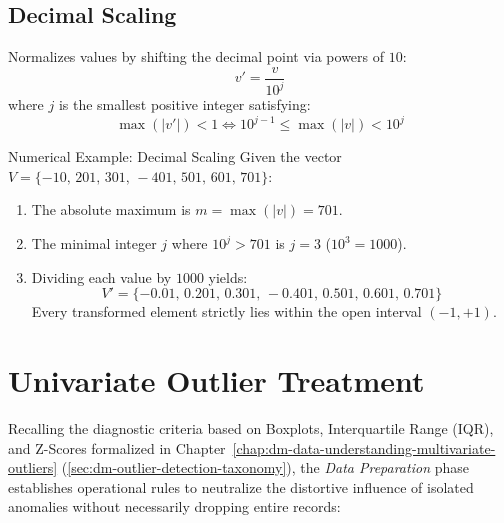 \subsection{Decimal Scaling}
Normalizes values by shifting the decimal point via powers of $10$:
\begin{equation}
    v' = \frac{v}{10^j}
\end{equation}
where $j$ is the smallest positive integer satisfying:
\begin{equation}
    \max(|v'|) < 1 \iff 10^{j-1} \le \max(|v|) < 10^j
\end{equation}

\begin{noteblock}{Numerical Example: Decimal Scaling}
Given the vector $V = \{-10,\, 201,\, 301,\, -401,\, 501,\, 601,\, 701\}$:
\begin{enumerate}
    \item The absolute maximum is $m = \max(|v|) = 701$.
    \item The minimal integer $j$ where $10^j > 701$ is $j=3$ ($10^3 = 1000$).
    \item Dividing each value by $1000$ yields:
    \begin{equation}
        V' = \{-0.01,\, 0.201,\, 0.301,\, -0.401,\, 0.501,\, 0.601,\, 0.701\}
    \end{equation}
    Every transformed element strictly lies within the open interval $(-1, +1)$.
\end{enumerate}
\end{noteblock}

\section{Univariate Outlier Treatment}
\label{sec:dm-univariate-outlier-treatment}

Recalling the diagnostic criteria based on Boxplots, Interquartile Range (IQR), and Z-Scores formalized in Chapter~\ref{chap:dm-data-understanding-multivariate-outliers} (\autoref{sec:dm-outlier-detection-taxonomy}), the \textit{Data Preparation} phase establishes operational rules to neutralize the distortive influence of isolated anomalies without necessarily dropping entire records:


